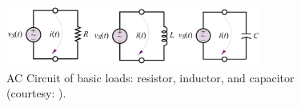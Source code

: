 \begin{figure}[ht]
\centering
\includegraphics[width=3.3in]{figs/threebasicloads.pdf}
\caption{AC Circuit of basic loads: resistor, inductor, and capacitor (courtesy: \cite{eebook}).}
\label{fig_threebasicloads}
\end{figure}
